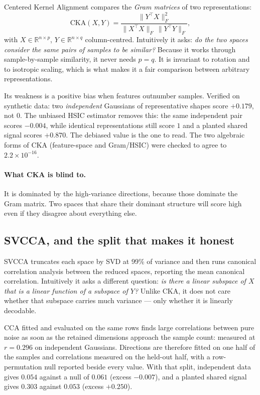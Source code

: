\documentclass[10pt]{article}
\newcommand{\obs}[1]{\textcolor{observedblue}{#1}}
\newcommand{\R}{\mathbb{R}}
\begin{document}
Centered Kernel Alignment compares the \emph{Gram matrices} of two representations:
\begin{equation}
  \mathrm{CKA}(X,Y) = \frac{\|Y^\top X\|_F^2}{\|X^\top X\|_F \, \|Y^\top Y\|_F},
\end{equation}
with $X\in\R^{n\times p}$, $Y\in\R^{n\times q}$ column-centred. Intuitively it asks: \emph{do the two
spaces consider the same pairs of samples to be similar?} Because it works through
sample-by-sample similarity, it never needs $p=q$. It is invariant to rotation and to isotropic
scaling, which is what makes it a fair comparison between arbitrary representations.

Its weakness is a positive bias when features outnumber samples. Verified on synthetic data:
two \emph{independent} Gaussians of representative shapes score \obs{$+0.179$}, not $0$. The unbiased
HSIC estimator removes this: the same independent pair scores \obs{$-0.004$}, while identical
representations still score $1$ and a planted shared signal scores \obs{$+0.870$}. The debiased value
is the one to read. The two algebraic forms of CKA (feature-space and Gram/HSIC) were checked to
agree to \obs{$2.2\times10^{-16}$}.

\paragraph{What CKA is blind to.} It is dominated by the high-variance directions, because those
dominate the Gram matrix. Two spaces that share their dominant structure will score high even if
they disagree about everything else.

\subsection{SVCCA, and the split that makes it honest}

SVCCA truncates each space by SVD at 99\% of variance and then runs canonical correlation analysis
between the reduced spaces, reporting the mean canonical correlation. Intuitively it asks a different
question: \emph{is there a linear subspace of $X$ that is a linear function of a subspace of $Y$?}
Unlike CKA, it does not care whether that subspace carries much variance --- only whether it is
linearly decodable.

CCA fitted and evaluated on the same rows finds large correlations between pure noise as soon as the
retained dimensions approach the sample count: measured at \obs{$r=0.296$} on independent Gaussians.
Directions are therefore fitted on one half of the samples and correlations measured on the held-out
half, with a row-permutation null reported beside every value. With that split, independent data
gives \obs{$0.054$} against a null of \obs{$0.061$} (excess \obs{$-0.007$}), and a planted shared
signal gives \obs{$0.303$} against \obs{$0.053$} (excess \obs{$+0.250$}).
\end{document}
